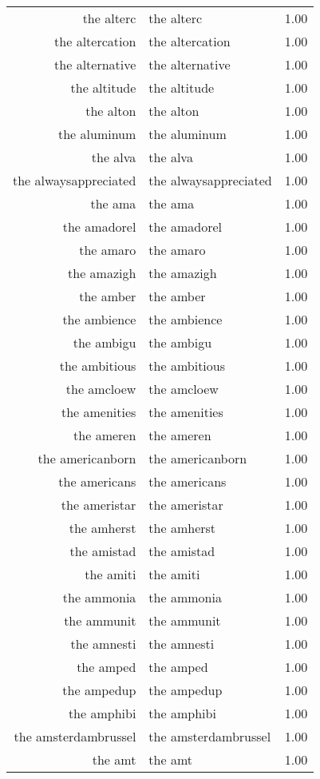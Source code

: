 \begin{table}[ht]
\begin{tabular}{rlr}
  the alterc & the alterc & 1.00 \\ 
  the altercation & the altercation & 1.00 \\ 
  the alternative & the alternative & 1.00 \\ 
  the altitude & the altitude & 1.00 \\ 
  the alton & the alton & 1.00 \\ 
  the aluminum & the aluminum & 1.00 \\ 
  the alva & the alva & 1.00 \\ 
  the alwaysappreciated & the alwaysappreciated & 1.00 \\ 
  the ama & the ama & 1.00 \\ 
  the amadorel & the amadorel & 1.00 \\ 
  the amaro & the amaro & 1.00 \\ 
  the amazigh & the amazigh & 1.00 \\ 
  the amber & the amber & 1.00 \\ 
  the ambience & the ambience & 1.00 \\ 
  the ambigu & the ambigu & 1.00 \\ 
  the ambitious & the ambitious & 1.00 \\ 
  the amcloew & the amcloew & 1.00 \\ 
  the amenities & the amenities & 1.00 \\ 
  the ameren & the ameren & 1.00 \\ 
  the americanborn & the americanborn & 1.00 \\ 
  the americans & the americans & 1.00 \\ 
  the ameristar & the ameristar & 1.00 \\ 
  the amherst & the amherst & 1.00 \\ 
  the amistad & the amistad & 1.00 \\ 
  the amiti & the amiti & 1.00 \\ 
  the ammonia & the ammonia & 1.00 \\ 
  the ammunit & the ammunit & 1.00 \\ 
  the amnesti & the amnesti & 1.00 \\ 
  the amped & the amped & 1.00 \\ 
  the ampedup & the ampedup & 1.00 \\ 
  the amphibi & the amphibi & 1.00 \\ 
  the amsterdambrussel & the amsterdambrussel & 1.00 \\ 
  the amt & the amt & 1.00 \\ 

\end{tabular}
\end{table}
